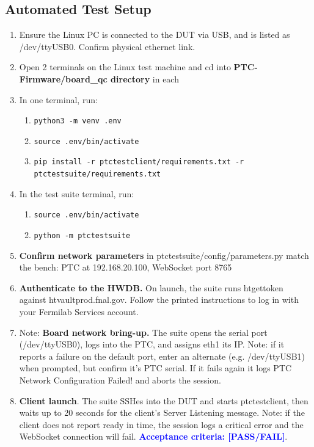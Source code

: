 \documentclass[a4paper,12pt]{article}
\begin{document}
\subsection{Automated Test Setup}
\label{section:automated_test}

    \begin{enumerate}
        \item Ensure the Linux PC is connected to the DUT via USB, and is listed as /dev/ttyUSB0. Confirm physical ethernet link. 
        \item Open 2 terminals on the Linux test machine and cd into \textbf{PTC-Firmware/board\_qc directory} in each
        \item In one terminal, run: 
            \begin{enumerate}
                \item \texttt{python3 -m venv .env}
                \item \texttt{source .env/bin/activate}
                \item \texttt{pip install -r ptctestclient/requirements.txt -r ptctestsuite/requirements.txt}
            \end{enumerate}
        \item In the test suite terminal, run: 
            \begin{enumerate}
                \item \texttt{source .env/bin/activate}
                \item \texttt{python -m ptctestsuite}
            \end{enumerate}  
        \item \textbf{Confirm network parameters} in ptctestsuite/config/parameters.py match the bench: PTC at 192.168.20.100, WebSocket port 8765
        \item \textbf{Authenticate to the HWDB.} On launch, the suite runs htgettoken against htvaultprod.fnal.gov. Follow the printed instructions to log in with your Fermilab Services account. 
        \item Note: \textbf{Board network bring-up.} The suite opens the serial port (/dev/ttyUSB0), logs into the PTC, and assigns eth1 its IP. Note: if it reports a failure on the default port, enter an alternate (e.g. /dev/ttyUSB1) when prompted, but confirm it’s PTC serial. If it fails again it logs PTC Network Configuration Failed! and aborts the session. 
        \item \textbf{Client launch}. The suite SSHes into the DUT and starts ptctestclient, then waits up to 20 seconds for the client's Server Listening message. Note: if the client does not report ready in time, the session logs a critical error and the WebSocket connection will fail. \textcolor{blue}{\textbf{Acceptance criteria: [PASS/FAIL]}}.

\end{enumerate}
\end{document}
